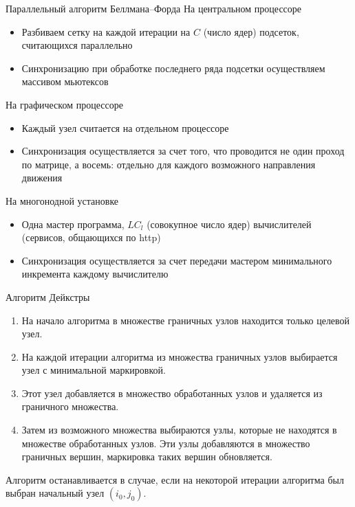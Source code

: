     \begin{frame}[t]{Параллельный алгоритм Беллмана--Форда}
        На центральном процессоре
        \begin{itemize}
            \item Разбиваем сетку на каждой итерации на $C$ (число ядер) подсеток, считающихся параллельно
            \item Синхронизацию при обработке последнего ряда подсетки осуществляем массивом мьютексов
        \end{itemize}
        На графическом процессоре
        \begin{itemize}
            \item Каждый узел считается на отдельном процессоре
            \item Синхронизация осуществляется за счет того, что проводится не один проход по матрице, а восемь: отдельно для каждого возможного направления движения
        \end{itemize}
        На многонодной установке
        \begin{itemize}
            \item Одна мастер программа, $LC_l$ (совокупное число ядер) вычислителей (сервисов, общающихся по http)
            \item Синхронизация осуществляется за счет передачи мастером минимального инкремента каждому вычислителю
        \end{itemize}
    \end{frame}
    \begin{frame}[t]{Алгоритм Дейкстры}
        \begin{enumerate}
            \item На начало алгоритма в множестве граничных узлов находится только целевой узел. 
            \item На каждой итерации алгоритма из множества граничных узлов выбирается узел с минимальной маркировкой.
            \item Этот узел добавляется в множество обработанных узлов и удаляется из граничного множества.
            \item Затем из возможного множества выбираются узлы, которые не находятся в множестве обработанных узлов. Эти узлы добавляются в множество граничных вершин, маркировка таких вершин обновляется.
        \end{enumerate}
        Алгоритм останавливается в случае, если на некоторой итерации алгоритма был выбран начальный узел $(i_0,j_0)$.
    \end{frame}
